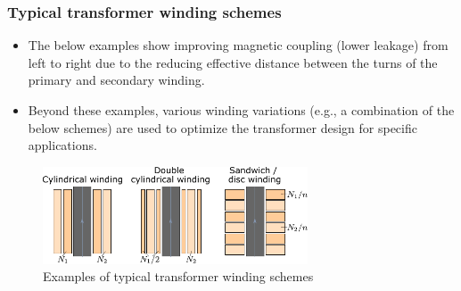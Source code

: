 \begin{frame}
	\frametitle{Typical transformer winding schemes}
	\begin{itemize}
		\item The below examples show improving magnetic coupling (lower leakage) from left to right due to the reducing effective distance between the turns of the primary and secondary winding.
		\item Beyond these examples, various winding variations (e.g., a combination of the below schemes) are used to optimize the transformer design for specific applications. 
	\end{itemize}
	\vspace{0.5em}
	\begin{figure}
		\includegraphics[width=0.7\textwidth]{fig/lec04/Transformer_winding_types.pdf}
		\caption{Examples of typical transformer winding schemes}
		\label{fig:Transformer_winding_types}
	\end{figure}
\end{frame}

